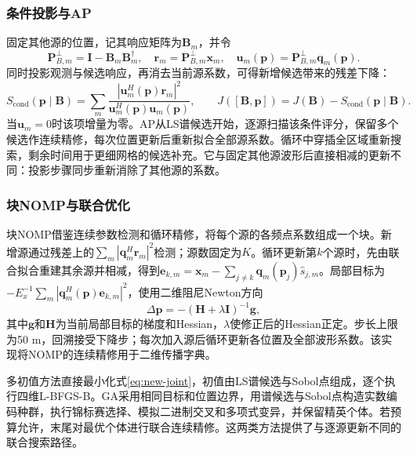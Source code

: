 \subsubsection{条件投影与AP}
固定其他源的位置，记其响应矩阵为$\mathbf B_m$，并令
\begin{equation}
\mathbf P_{B,m}^\perp=\mathbf I-\mathbf B_m\mathbf B_m^\dagger,\quad
\mathbf r_m=\mathbf P_{B,m}^\perp\mathbf x_m,\quad
\mathbf u_m(\mathbf p)=\mathbf P_{B,m}^\perp\mathbf q_m(\mathbf p).
\end{equation}
同时投影观测与候选响应，再消去当前源系数，可得新增候选带来的残差下降：
\begin{equation}\label{eq:new-conditional}
S_{\mathrm{cond}}(\mathbf p\mid\mathbf B)=\sum_m
\frac{|\mathbf u_m^H(\mathbf p)\mathbf r_m|^2}{\mathbf u_m^H(\mathbf p)\mathbf u_m(\mathbf p)},\qquad
J([\mathbf B,\mathbf p])=J(\mathbf B)-S_{\mathrm{cond}}(\mathbf p\mid\mathbf B).
\end{equation}
当$\mathbf u_m=0$时该项增量为零。AP从LS谱候选开始，逐源扫描该条件评分，保留多个候选作连续精修，每次位置更新后重新拟合全部源系数。循环中穿插全区域重新搜索，剩余时间用于更细网格的候选补充。它与固定其他源波形后直接相减的更新不同：投影步骤同步重新消除了其他源的系数。

\subsubsection{块NOMP与联合优化}
块NOMP借鉴连续参数检测和循环精修\cite{ref08}，将每个源的各频点系数组成一个块。新增源通过残差上的$\sum_m|\mathbf q_m^H\mathbf r_m|^2$检测；源数固定为$K$。循环更新第$k$个源时，先由联合拟合重建其余源并相减，得到$\mathbf e_{k,m}=\mathbf x_m-\sum_{j\ne k}\mathbf q_m(\mathbf p_j)\widehat s_{j,m}$。局部目标为$-E_x^{-1}\sum_m|\mathbf q_m^H(\mathbf p)\mathbf e_{k,m}|^2$，使用二维阻尼Newton方向
\begin{equation}
\Delta\mathbf p=-(\mathbf H+\lambda\mathbf I)^{-1}\mathbf g,
\end{equation}
其中$\mathbf g$和$\mathbf H$为当前局部目标的梯度和Hessian，$\lambda$使修正后的Hessian正定。步长上限为50 m，回溯接受下降步；每次加入源后循环更新各位置及全部波形系数。该实现将NOMP的连续精修用于二维传播字典。

多初值方法直接最小化式\eqref{eq:new-joint}，初值由LS谱候选与Sobol点组成，逐个执行四维L-BFGS-B。GA采用相同目标和位置边界，用谱候选与Sobol点构造实数编码种群，执行锦标赛选择、模拟二进制交叉\cite{ref16}和多项式变异，并保留精英个体。若预算允许，末尾对最优个体进行联合连续精修。这两类方法提供了与逐源更新不同的联合搜索路径。

